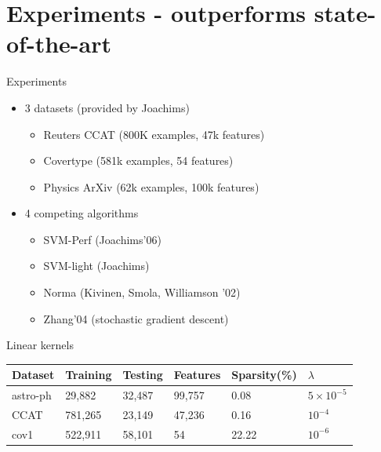 \section{Experiments - outperforms state-of-the-art}
\begin{frame}{Experiments}
    \begin{itemize}
        \item 3 datasets (provided by Joachims) 
            \begin{itemize}
                \item Reuters CCAT (800K examples, 47k features)
                \item Covertype (581k examples, 54 features)
                \item Physics ArXiv (62k examples, 100k features)
            \end{itemize}
        \item 4 competing algorithms
            \begin{itemize}
                \item SVM-Perf (Joachims'06)
                \item SVM-light (Joachims)
                \item Norma (Kivinen, Smola, Williamson '02)
                \item Zhang'04 (stochastic gradient descent)
            \end{itemize}
    \end{itemize}
\end{frame}

\begin{frame}{Linear kernels}
\begin{table}[ht]
    \centering
    \begin{tabular}{l|l|l|l|l|l}
            \hline
            Dataset & Training & Testing & Features & Sparsity(\%) & $\lambda$ \\ \hline 
            astro-ph & 29,882 & 32,487 & 99,757 & 0.08 & $5\times 10^{-5}$ \\ 
            CCAT & 781,265 & 23,149 & 47,236 & 0.16 & $10^{-4}$ \\ 
            cov1 & 522,911 & 58,101 & 54 & 22.22 & $10^{-6}$ \\ \hline
        \end{tabular}
    \end{table}
\end{frame}

